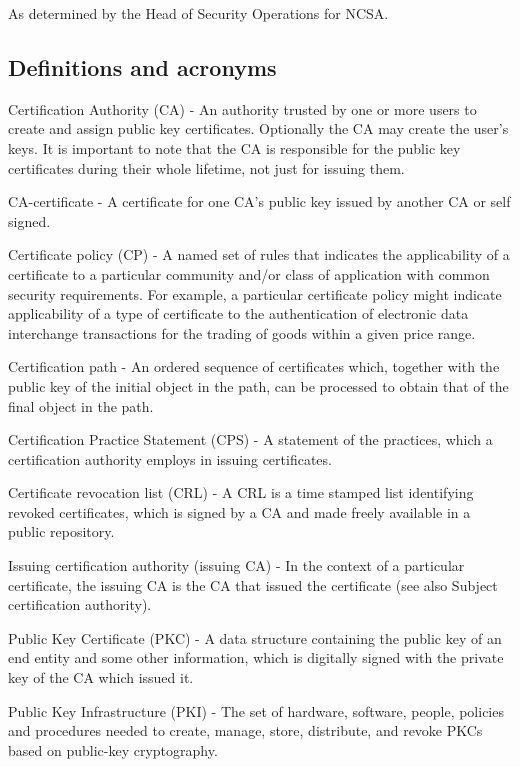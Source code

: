 \documentclass[10pt]{article}
\begin{document}
As determined by the Head of Security Operations for NCSA.

\subsection{Definitions and acronyms}

Certification Authority (CA) - An authority trusted by 
one or more users to create and assign public key 
certificates. Optionally the CA may create the user's 
keys. It is important to note that the CA is responsible 
for the public key certificates during their whole 
lifetime, not just for issuing them. 
 
CA-certificate - A certificate for one CA's public key
issued by another CA or self signed.  
 
Certificate policy (CP) - A named set of rules that 
indicates the applicability of a certificate to a 
particular community and/or class of application with 
common security requirements. For example, a particular 
certificate policy might indicate applicability of a 
type of certificate to the authentication of electronic 
data interchange transactions for the trading of goods 
within a given price range. 
 
Certification path - An ordered sequence of certificates 
which, together with the public key of the initial 
object in the path, can be processed to obtain that of 
the final object in the path. 

Certification Practice Statement (CPS) - A statement of the practices, 
which a certification authority employs in issuing certificates. 
 
Certificate revocation list (CRL) - A CRL is a time 
stamped list identifying revoked certificates, which is 
signed by a CA and made freely available in a public 
repository. 

Issuing certification authority (issuing CA) - In the context of a 
particular certificate, the issuing CA is the CA that issued the 
certificate (see also Subject certification authority). 
 
Public Key Certificate (PKC) - A data structure 
containing the public key of an end entity and some 
other information, which is digitally signed with the 
private key of the CA which issued it. 
 
Public Key Infrastructure (PKI) - The set of hardware, 
software, people, policies and procedures needed to 
create, manage, store, distribute, and revoke PKCs based 
on public-key cryptography. 
  
\end{document}
